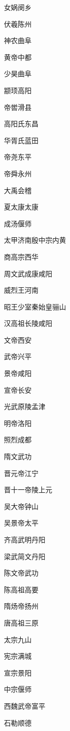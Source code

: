 \documentclass[a4paper,12pt,UTF8,twoside]{ctexbook}
\begin{document}
    女娲阌乡
    
    伏羲陈州
    
    神农曲阜
    
    黄帝中都
    
    少昊曲阜
    
    颛顼高阳
    
    帝喾滑县
    
    高阳氏东昌
    
    华胥氏蓝田
    
    帝尧东平
    
    帝舜永州
    
    大禹会稽
    
    夏太康太康
    
    成汤偃师
    
    太甲济南殷中宗内黄
    
    商高宗西华
    
    周文武成康咸阳
    
    威烈王河南
    
    昭王少室秦始皇骊山
    
    汉高祖长陵咸阳
    
    文帝西安
    
    武帝兴平
    
    景帝咸阳
    
    宣帝长安
    
    光武原陵孟津
    
    明帝洛阳
    
    照烈成都
    
    隋文武功
    
    晋元帝江宁
    
    晋十一帝陵上元
    
    吴大帝钟山
    
    吴景帝太平
    
    齐高武明丹阳
    
    梁武简文丹阳
    
    陈文帝武功
    
    陈高祖高要
    
    隋炀帝扬州
    
    唐高祖三原
    
    太宗九山
    
    宪宗满城
    
    宣宗景阳
    
    中宗偃师
    
    西魏武帝富平
    
    石勒顺德
    
\end{document}
